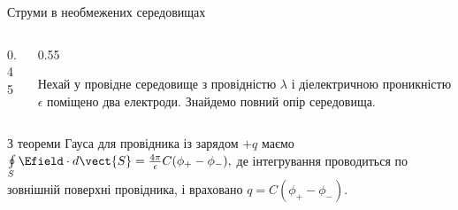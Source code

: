 \documentclass[onlytextwidth]{beamer}
\begin{document}
\begin{frame}{Струми в необмежених середовищах}{}
	\begin{columns}
		\begin{column}{0.45\linewidth}\centering
			
		\end{column}
		\begin{column}{0.55\linewidth}
			\begin{block}{}\justifying
				Нехай у провідне середовище з провідністю $\lambda$ і діелектричною проникністю $\epsilon$ поміщено два електроди. Знайдемо
				повний опір
				середовища.
			\end{block}
		\end{column}
	\end{columns}
	\begin{overprint}
		\begin{block}{}\justifying
			З теореми Гауса для провідника із зарядом $+q$ маємо\\
			\(
			\oint\limits_S \Efield\cdot d\vect{S} = \frac{4\pi}{\epsilon} C(\phi_+ - \phi_-),
			\)
			де інтегрування проводиться по зовнішній поверхні провідника, і враховано $ q = C(\phi_+ - \phi_-) $.

			\medskip



\end{block}
\end{overprint}
\end{frame}
\end{document}
